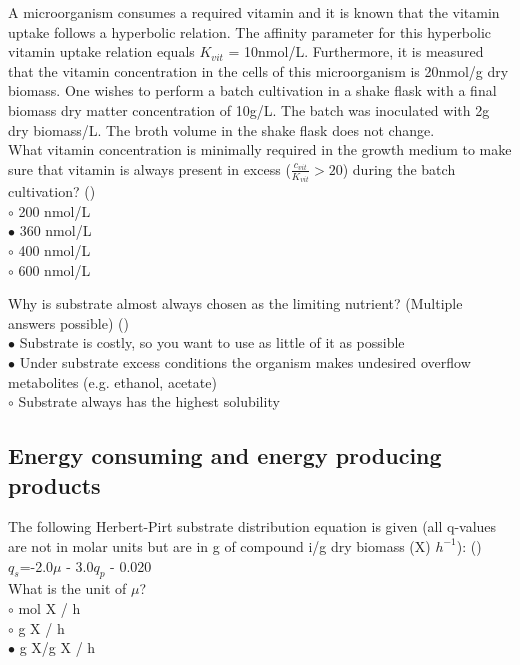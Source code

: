 \documentclass[]{beamer}
\begin{document}
\begin{frame}[shrink] {} 
\color{blue}
A microorganism consumes a required vitamin and it is known that the
vitamin uptake follows a hyperbolic relation. The affinity parameter for this
hyperbolic vitamin uptake relation equals $K_{vit}$ = 10nmol/L. Furthermore, it
is measured that the vitamin concentration in the cells of this
microorganism is 20nmol/g dry biomass. One wishes to perform a batch
cultivation in a shake flask with a final biomass dry matter concentration of
10g/L. The batch was inoculated with 2g dry biomass/L. The broth
volume in the shake flask does not change.\\[0.3em]
What vitamin concentration is minimally required in the growth medium to
make sure that vitamin is always present in excess ($\frac{c_{vit}}{K_{vit}}>20$) during the
batch cultivation? ({\color{green}{Q3a}})\\
\color{black}
\setlength{\parindent}{-0.4cm}
{\color{red}$\circ$}  200 nmol/L \\
{\color{red}$\bullet$}  360 nmol/L \\
{\color{red}$\circ$}  400 nmol/L \\
{\color{red}$\circ$}  600 nmol/L \\
\end{frame}


\begin{frame}[shrink] {} 
\color{blue}
Why is substrate almost always chosen as the limiting nutrient? (Multiple answers possible) ({\color{green}{Q3b}})\\
\color{black}
\setlength{\parindent}{-0.4cm}
{\color{red}$\bullet$}  Substrate is costly, so you want to use as little of it as possible \\
{\color{red}$\bullet$}  Under substrate excess conditions the organism makes undesired overflow metabolites (e.g. ethanol, acetate) \\
{\color{red}$\circ$}  Substrate always has the highest solubility \\
\end{frame}

\subsection{Energy consuming and energy producing products}
\begin{frame}[shrink] {} 
\color{blue}
The following Herbert-Pirt substrate distribution equation is given (all q-values are not in molar units but are in g of compound i/g dry biomass (X) $h^{-1}$): ({\color{green}{Q1a}})\\[0.3em]
{\color{gray} $q_{s}$=-2.0$\mu$ - 3.0$q_{p}$ - 0.020}\\[0.3em]
What is the unit of $\mu$?\\
\color{black}
\setlength{\parindent}{-0.4cm}
{\color{red}$\circ$}  mol X / h \\
{\color{red}$\circ$}  g X / h \\
{\color{red}$\bullet$}  g X/g X / h \\
\end{frame}
\end{document}
